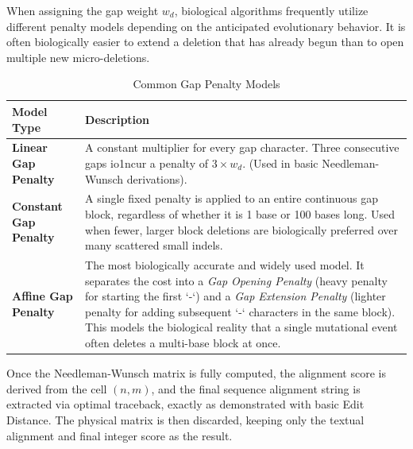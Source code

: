When assigning the gap weight \(w_d\), biological algorithms frequently utilize different penalty models depending on the anticipated evolutionary behavior. It is often biologically easier to extend a deletion that has already begun than to open multiple new micro-deletions.

\begin{table}[H]
    \centering
    \begin{tabularx}{\textwidth}{l X}
        \toprule
        \textbf{Model Type} & \textbf{Description} \\
        \midrule
        \textbf{Linear Gap Penalty} & A constant multiplier for every gap character. Three consecutive gaps io1ncur a penalty of \(3 \times w_d\). (Used in basic Needleman-Wunsch derivations). \\
        \textbf{Constant Gap Penalty} & A single fixed penalty is applied to an entire continuous gap block, regardless of whether it is 1 base or 100 bases long. Used when fewer, larger block deletions are biologically preferred over many scattered small indels. \\
        \textbf{Affine Gap Penalty} & The most biologically accurate and widely used model. It separates the cost into a \textit{Gap Opening Penalty} (heavy penalty for starting the first `-`) and a \textit{Gap Extension Penalty} (lighter penalty for adding subsequent `-` characters in the same block). This models the biological reality that a single mutational event often deletes a multi-base block at once. \\
        \bottomrule
    \end{tabularx}
    \caption*{Common Gap Penalty Models}
\end{table}

Once the Needleman-Wunsch matrix is fully computed, the alignment score is derived from the cell \((n, m)\), and the final sequence alignment string is extracted via optimal traceback, exactly as demonstrated with basic Edit Distance. The physical matrix is then discarded, keeping only the textual alignment and final integer score as the result.
